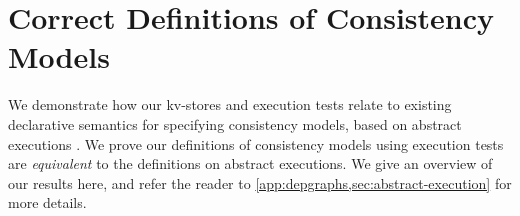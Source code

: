\section{Correct Definitions of Consistency Models}
\label{sec:other_formalisms}

We demonstrate how our kv-stores and execution 
tests relate to existing declarative semantics for specifying  
consistency models, based on abstract executions \cite{framework-concur}. 
We prove our definitions of consistency models using execution tests
are \emph{equivalent} to the definitions on abstract executions.
We give an overview of our results here, and refer the reader to \cref{app:depgraphs,sec:abstract-execution}
for more details.


